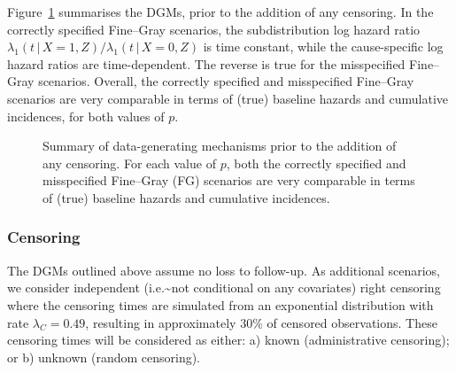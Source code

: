 \documentclass[
  letterpaper,
  DIV=11,
  numbers=noendperiod]{scrreprt}
\newcommand{\given}{\,|\,}
\begin{document}
Figure~\ref{fig-scenarios-vis} summarises the DGMs, prior to the
addition of any censoring. In the correctly specified Fine--Gray
scenarios, the subdistribution log hazard ratio
\(\lambda_1(t \given X = 1, Z)/\lambda_1(t \given X = 0, Z)\) is time
constant, while the cause-specific log hazard ratios are time-dependent.
The reverse is true for the misspecified Fine--Gray scenarios. Overall,
the correctly specified and misspecified Fine--Gray scenarios are very
comparable in terms of (true) baseline hazards and cumulative
incidences, for both values of \(p\).

\begin{figure}


\caption{\label{fig-scenarios-vis}Summary of data-generating mechanisms
prior to the addition of any censoring. For each value of \(p\), both
the correctly specified and misspecified Fine--Gray (FG) scenarios are
very comparable in terms of (true) baseline hazards and cumulative
incidences.}

\end{figure}%

\subsubsection{Censoring}\label{censoring}

The DGMs outlined above assume no loss to follow-up. As additional
scenarios, we consider independent (i.e.\textasciitilde not conditional
on any covariates) right censoring where the censoring times are
simulated from an exponential distribution with rate
\(\lambda_C = 0.49\), resulting in approximately 30\% of censored
observations. These censoring times will be considered as either: a)
known (administrative censoring); or b) unknown (random censoring).
\end{document}
